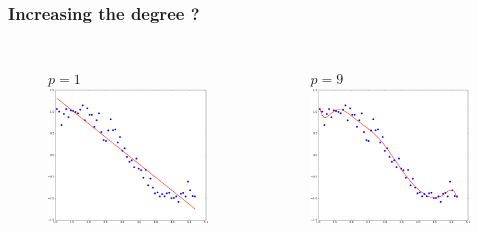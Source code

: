 \documentclass[handout]{beamer}
\begin{document}
\begin{frame}
\frametitle{Increasing the degree ?}
\begin{columns}
\vspace{-2em}
\begin{figure}
$p=1$
\includegraphics[width=0.99\textwidth]{./fig/L1/linreg_pow1.png}
\end{figure}
\vspace{-2em}
\begin{figure}
$p=9$
\includegraphics[width=0.99\textwidth]{./fig/L1/linreg_pow9.png}

\end{figure}
\end{columns}
\end{frame}
\end{document}

